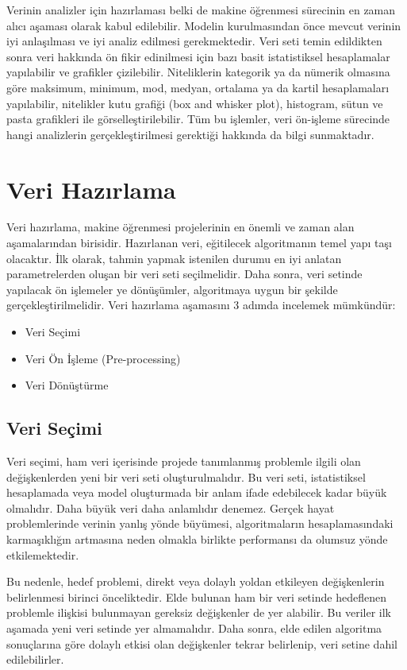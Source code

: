 \documentclass[12pt,twoside]{deuthesis}
\begin{document}
Verinin analizler için hazırlaması belki de makine öğrenmesi sürecinin en zaman alıcı aşaması olarak kabul edilebilir. Modelin kurulmasından önce mevcut verinin iyi anlaşılması ve iyi analiz edilmesi gerekmektedir. Veri seti temin edildikten sonra veri hakkında ön fikir edinilmesi için bazı basit istatistiksel hesaplamalar yapılabilir ve grafikler çizilebilir. Niteliklerin kategorik ya da nümerik olmasına göre maksimum, minimum, mod, medyan, ortalama ya da kartil hesaplamaları yapılabilir, nitelikler kutu grafiği (box and whisker plot), histogram, sütun ve pasta grafikleri ile görselleştirilebilir. Tüm bu işlemler, veri ön-işleme sürecinde hangi analizlerin gerçekleştirilmesi gerektiği hakkında da bilgi sunmaktadır.

\hypertarget{veri-hazux131rlama}{%
\section{Veri Hazırlama}\label{veri-hazux131rlama}}

Veri hazırlama, makine öğrenmesi projelerinin en önemli ve zaman alan aşamalarından birisidir. Hazırlanan veri, eğitilecek algoritmanın temel yapı taşı olacaktır. İlk olarak, tahmin yapmak istenilen durumu en iyi anlatan parametrelerden oluşan bir veri seti seçilmelidir. Daha sonra, veri setinde yapılacak ön işlemeler ye dönüşümler, algoritmaya uygun bir şekilde gerçekleştirilmelidir. Veri hazırlama aşamasını 3 adımda incelemek mümkündür:
\begin{itemize}
\item
  Veri Seçimi
\item
  Veri Ön İşleme (Pre-processing)
\item
  Veri Dönüştürme
\end{itemize}
\hypertarget{veri-seuxe7imi}{%
\subsection{Veri Seçimi}\label{veri-seuxe7imi}}

Veri seçimi, ham veri içerisinde projede tanımlanmış problemle ilgili olan değişkenlerden yeni bir veri seti oluşturulmalıdır. Bu veri seti, istatistiksel hesaplamada veya model oluşturmada bir anlam ifade edebilecek kadar büyük olmalıdır. Daha büyük veri daha anlamlıdır denemez. Gerçek hayat problemlerinde verinin yanlış yönde büyümesi, algoritmaların hesaplamasındaki karmaşıklığın artmasına neden olmakla birlikte performansı da olumsuz yönde etkilemektedir.

Bu nedenle, hedef problemi, direkt veya dolaylı yoldan etkileyen değişkenlerin belirlenmesi birinci önceliktedir. Elde bulunan ham bir veri setinde hedeflenen problemle ilişkisi bulunmayan gereksiz değişkenler de yer alabilir. Bu veriler ilk aşamada yeni veri setinde yer almamalıdır. Daha sonra, elde edilen algoritma sonuçlarına göre dolaylı etkisi olan değişkenler tekrar belirlenip, veri setine dahil edilebilirler.
\end{document}
